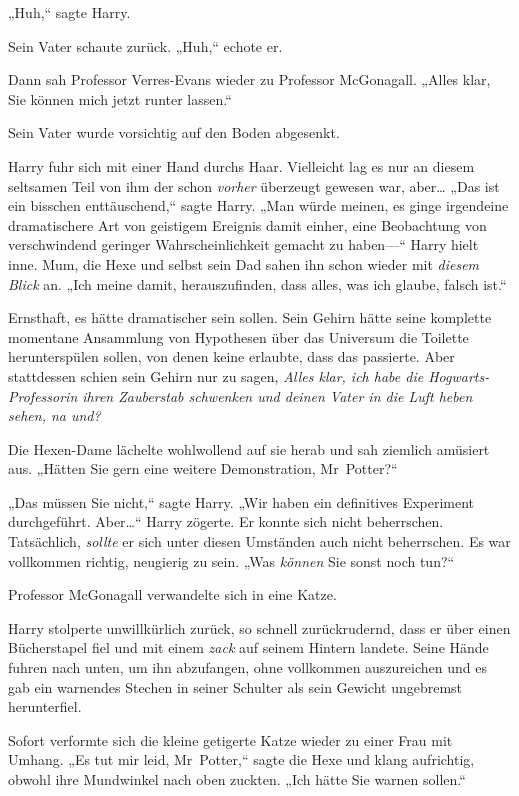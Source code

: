{„Huh,“ sagte Harry.

Sein Vater schaute zurück. „Huh,“ echote er.

Dann sah Professor Verres-Evans wieder zu Professor McGonagall. „Alles klar, Sie können mich jetzt runter lassen.“

Sein Vater wurde vorsichtig auf den Boden abgesenkt.

Harry fuhr sich mit einer Hand durchs Haar. Vielleicht lag es nur an diesem seltsamen Teil von ihm der schon \emph{vorher} überzeugt gewesen war, aber… „Das ist ein bisschen enttäuschend,“ sagte Harry. „Man würde meinen, es ginge irgendeine dramatischere Art von geistigem Ereignis damit einher, eine Beobachtung von verschwindend geringer Wahrscheinlichkeit gemacht zu haben—“ Harry hielt inne. Mum, die Hexe und selbst sein Dad sahen ihn schon wieder mit \emph{diesem Blick} an. „Ich meine damit, herauszufinden, dass alles, was ich glaube, falsch ist.“

Ernsthaft, es hätte dramatischer sein sollen. Sein Gehirn hätte seine komplette momentane Ansammlung von Hypothesen über das Universum die Toilette herunterspülen sollen, von denen keine erlaubte, dass das passierte. Aber stattdessen schien sein Gehirn nur zu sagen, \emph{Alles klar, ich habe die Hogwarts-Professorin ihren Zauberstab schwenken und deinen Vater in die Luft heben sehen, na und?}

Die Hexen-Dame lächelte wohlwollend auf sie herab und sah ziemlich amüsiert aus. „Hätten Sie gern eine weitere Demonstration, Mr~Potter?“

„Das müssen Sie nicht,“ sagte Harry. „Wir haben ein definitives Experiment durchgeführt. Aber…“ Harry zögerte. Er konnte sich nicht beherrschen. Tatsächlich, \emph{sollte} er sich unter diesen Umständen auch nicht beherrschen. Es war vollkommen richtig, neugierig zu sein. „Was \emph{können} Sie sonst noch tun?“

Professor McGonagall verwandelte sich in eine Katze.

Harry stolperte unwillkürlich zurück, so schnell zurückrudernd, dass er über einen Bücherstapel fiel und mit einem \emph{zack} auf seinem Hintern landete. Seine Hände fuhren nach unten, um ihn abzufangen, ohne vollkommen auszureichen und es gab ein warnendes Stechen in seiner Schulter als sein Gewicht ungebremst herunterfiel.

Sofort verformte sich die kleine getigerte Katze wieder zu einer Frau mit Umhang. „Es tut mir leid, Mr~Potter,“ sagte die Hexe und klang aufrichtig, obwohl ihre Mundwinkel nach oben zuckten. „Ich hätte Sie warnen sollen.“

}
